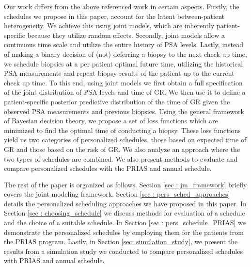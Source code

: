Our work differs from the above referenced work in certain aspects. Firstly, the schedules we propose in this paper, account for the latent between-patient heterogeneity. We achieve this using joint models, which are inherently patient-specific because they utilize random effects. Secondly, joint models allow a continuous time scale and utilize the entire history of PSA levels. Lastly, instead of making a binary decision of (not) deferring a biopsy to the next check up time, we schedule biopsies at a per patient optimal future time, utilizing the historical PSA measurements and repeat biopsy results of the patient up to the current check up time. To this end, using joint models we first obtain a full specification of the joint distribution of PSA levels and time of GR. We then use it to define a patient-specific posterior predictive distribution of the time of GR given the observed PSA measurements and previous biopsies. Using the general framework of Bayesian decision theory, we propose a set of loss functions which are minimized to find the optimal time of conducting a biopsy. These loss functions yield us two categories of personalized schedules, those based on expected time of GR and those based on the risk of GR. We also analyze an approach where the two types of schedules are combined. We also present methods to evaluate and compare personalized schedules with the PRIAS and annual schedule.

The rest of the paper is organized as follows. Section \ref{sec : jm_framework} briefly covers the joint modeling framework. Section \ref{sec : pers_sched_approaches} details the personalized scheduling approaches we have proposed in this paper. In Section \ref{sec : choosing_schedule} we discuss methods for evaluation of a schedule and the choice of a suitable schedule. In Section \ref{sec : pers_schedule_PRIAS} we demonstrate the personalized schedules by employing them for the patients from the PRIAS program. Lastly, in Section \ref{sec: simulation_study}, we present the results from a simulation study we conducted to compare personalized schedules with PRIAS and annual schedule.